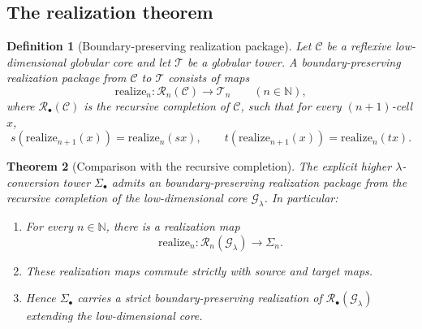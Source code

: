 \documentclass[webpdf,traditional,large,numbered]{oup-authoring-template}
\theoremstyle{thmstyleone}%
\newtheorem{theorem}{Theorem}[section]
\theoremstyle{thmstyletwo}%
\theoremstyle{thmstylethree}%
\newtheorem{definition}[theorem]{Definition}
\newcommand{\realize}{\mathrm{realize}}
\begin{document}
\subsection{The realization theorem}

\begin{definition}[Boundary-preserving realization package]
Let $\mathscr{C}$ be a reflexive low-dimensional globular core and let
$\mathscr{T}$ be a globular tower.  A \emph{boundary-preserving realization package}
from $\mathscr{C}$ to $\mathscr{T}$ consists of maps
\[
\realize_n:\mathscr{R}_n(\mathscr{C})\longrightarrow \mathscr{T}_n
\qquad (n\in\mathbb N),
\]
where $\mathscr{R}_\bullet(\mathscr{C})$ is the recursive completion of
$\mathscr{C}$, such that for every $(n+1)$-cell $x$,
\[
s(\realize_{n+1}(x))=\realize_n(sx),
\qquad
t(\realize_{n+1}(x))=\realize_n(tx).
\]
\end{definition}

\begin{theorem}[Comparison with the recursive completion]
\label{thm:A}
The explicit higher $\lambda$-conversion tower $\Sigma_\bullet$ admits an
boundary-preserving realization package from the recursive completion of the
low-dimensional core $\mathscr{G}_\lambda$.  In particular:
\begin{enumerate}[label=(\roman*)]
  \item For every $n\in\mathbb N$, there is a realization map
    \[
      \realize_n:\mathscr{R}_n(\mathscr{G}_\lambda)\to \Sigma_n.
    \]
  \item These realization maps commute strictly with source and target maps.
  \item Hence $\Sigma_\bullet$ carries a strict boundary-preserving realization
    of $\mathscr{R}_\bullet(\mathscr{G}_\lambda)$ extending the low-dimensional
    core.
\end{enumerate}
\end{theorem}
\end{document}
